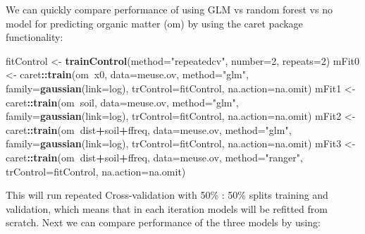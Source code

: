 \documentclass[graybox,natbib,nospthms,UStrade]{svmono}
\newenvironment{Shaded}{\begin{snugshade}}{\end{snugshade}}
\newcommand{\DataTypeTok}[1]{\textcolor[rgb]{0.27,0.27,0.27}{#1}}
\newcommand{\DecValTok}[1]{\textcolor[rgb]{0.06,0.06,0.06}{#1}}
\newcommand{\KeywordTok}[1]{\textcolor[rgb]{0.27,0.27,0.27}{\textbf{#1}}}
\newcommand{\NormalTok}[1]{#1}
\newcommand{\OperatorTok}[1]{\textcolor[rgb]{0.43,0.43,0.43}{\textbf{#1}}}
\newcommand{\StringTok}[1]{\textcolor[rgb]{0.5,0.5,0.5}{#1}}
\begin{document}
We can quickly compare performance of using GLM vs random forest vs no model for predicting organic matter (om) by using the caret package functionality:

\begin{Shaded}
\begin{Highlighting}[]
\NormalTok{fitControl <-}\StringTok{ }\KeywordTok{trainControl}\NormalTok{(}\DataTypeTok{method=}\StringTok{"repeatedcv"}\NormalTok{, }\DataTypeTok{number=}\DecValTok{2}\NormalTok{, }\DataTypeTok{repeats=}\DecValTok{2}\NormalTok{)}
\NormalTok{mFit0 <-}\StringTok{ }\NormalTok{caret}\OperatorTok{::}\KeywordTok{train}\NormalTok{(om}\OperatorTok{~}\NormalTok{x0, }\DataTypeTok{data=}\NormalTok{meuse.ov, }\DataTypeTok{method=}\StringTok{"glm"}\NormalTok{, }
               \DataTypeTok{family=}\KeywordTok{gaussian}\NormalTok{(}\DataTypeTok{link=}\NormalTok{log), }\DataTypeTok{trControl=}\NormalTok{fitControl, }
               \DataTypeTok{na.action=}\NormalTok{na.omit)}
\NormalTok{mFit1 <-}\StringTok{ }\NormalTok{caret}\OperatorTok{::}\KeywordTok{train}\NormalTok{(om}\OperatorTok{~}\NormalTok{soil, }\DataTypeTok{data=}\NormalTok{meuse.ov, }\DataTypeTok{method=}\StringTok{"glm"}\NormalTok{, }
               \DataTypeTok{family=}\KeywordTok{gaussian}\NormalTok{(}\DataTypeTok{link=}\NormalTok{log), }\DataTypeTok{trControl=}\NormalTok{fitControl, }
               \DataTypeTok{na.action=}\NormalTok{na.omit)}
\NormalTok{mFit2 <-}\StringTok{ }\NormalTok{caret}\OperatorTok{::}\KeywordTok{train}\NormalTok{(om}\OperatorTok{~}\NormalTok{dist}\OperatorTok{+}\NormalTok{soil}\OperatorTok{+}\NormalTok{ffreq, }\DataTypeTok{data=}\NormalTok{meuse.ov, }\DataTypeTok{method=}\StringTok{"glm"}\NormalTok{, }
               \DataTypeTok{family=}\KeywordTok{gaussian}\NormalTok{(}\DataTypeTok{link=}\NormalTok{log), }\DataTypeTok{trControl=}\NormalTok{fitControl, }
               \DataTypeTok{na.action=}\NormalTok{na.omit)}
\NormalTok{mFit3 <-}\StringTok{ }\NormalTok{caret}\OperatorTok{::}\KeywordTok{train}\NormalTok{(om}\OperatorTok{~}\NormalTok{dist}\OperatorTok{+}\NormalTok{soil}\OperatorTok{+}\NormalTok{ffreq, }\DataTypeTok{data=}\NormalTok{meuse.ov, }\DataTypeTok{method=}\StringTok{"ranger"}\NormalTok{, }
               \DataTypeTok{trControl=}\NormalTok{fitControl, }\DataTypeTok{na.action=}\NormalTok{na.omit)}
\end{Highlighting}
\end{Shaded}

This will run repeated Cross-validation with 50\% : 50\% splits training and validation,
which means that in each iteration models will be refitted from scratch. Next we can compare performance of the three models by using:
\end{document}
